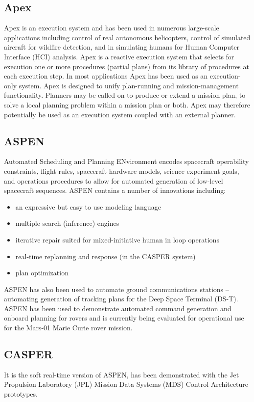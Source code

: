 \documentclass[conference]{IEEEtran}
\begin{document}
\subsection{\textbf{Apex}}\label{sec:apex}
Apex is an execution system and has been used in numerous large-scale applications including control of real autonomous helicopters, control of simulated aircraft for wildfire detection, and in simulating humans for Human Computer Interface (HCI) analysis.
Apex is a reactive execution system that selects for execution one or more procedures (partial plans) from its library of procedures at each execution step. In most applications Apex has been used as an execution-only system. Apex is designed to unify plan-running and mission-management functionality. Planners may be called on to produce or extend a mission plan, to solve a local planning problem within a mission plan or both. Apex may therefore potentially be used as an execution system coupled with an external planner.


\subsection{\textbf{ASPEN}}\label{sec:aspen}
Automated Scheduling and Planning ENvironment encodes spacecraft operability constraints, flight rules, spacecraft hardware models, science experiment goals, and operations procedures to allow for automated generation of low-level spacecraft sequences. ASPEN contains a number of innovations including: 

\begin{itemize}
  \item an expressive but easy to use modeling language
  \item multiple search (inference) engines
  \item iterative repair suited for mixed-initiative human in loop operations
  \item real-time replanning and response (in the CASPER system)
  \item plan optimization
\end{itemize}
 
ASPEN has also been used to automate ground communications stations – automating generation of tracking plans for the Deep Space Terminal (DS-T). ASPEN has been used to demonstrate automated command generation and onboard planning for rovers and is currently being evaluated for operational use for the Mars-01 Marie Curie rover mission. 


\subsection{\textbf{CASPER}}\label{sec:casper}
It is the soft real-time version of ASPEN, has been demonstrated with the Jet Propulsion Laboratory (JPL) Mission Data Systems (MDS) Control Architecture prototypes.
\end{document}
